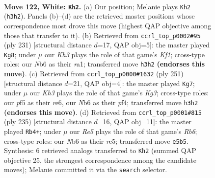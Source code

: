 \documentclass[11pt]{article}
\begin{document}
\clearpage

\begin{figure}[p]\centering
\begin{subfigure}{0.46\textwidth}\centering
\resizebox{\linewidth}{!}{%
\newchessgame
\chessboard[
  setfen={8/r5p1/1N4k1/4Rp1p/7P/6PK/8/8 w - - 2 122},
  showmover=false,
  pgfstyle=straightmove, color=movearrow, markmove={h3-h2}
]}
\caption{}
\end{subfigure}\hfill
\begin{subfigure}{0.46\textwidth}\centering
\resizebox{\linewidth}{!}{%
\newchessgame
\chessboard[
  setfen={5k2/5p2/4pP2/4P3/4PK2/2r5/8/R7 b - - 48 116},
  showmover=false,
  pgfstyle=straightmove, color=movearrow, markmove={f8-g8}
]}
\caption{}
\end{subfigure}
\\[4pt]
\begin{subfigure}{0.46\textwidth}\centering
\resizebox{\linewidth}{!}{%
\newchessgame
\chessboard[
  setfen={8/8/4R1k1/5p1p/5P1P/6PK/1r6/8 b - - 98 126},
  showmover=false,
  pgfstyle=straightmove, color=movearrow, markmove={g6-g7}
]}
\caption{}
\end{subfigure}\hfill
\begin{subfigure}{0.46\textwidth}\centering
\resizebox{\linewidth}{!}{%
\newchessgame
\chessboard[
  setfen={8/5pk1/5p2/2R4P/5KP1/1r3P2/8/8 b - - 70 118},
  showmover=false,
  pgfstyle=straightmove, color=movearrow, markmove={b3-b4}
]}
\caption{}
\end{subfigure}
\caption{\textbf{Move 122, White: \texttt{Kh2}.} (a) Our position; Melanie plays \texttt{Kh2} (\texttt{h3h2}). Panels (b)--(d) are the retrieved master positions whose correspondence most drove this move (highest QAP objective among those that transfer to it). (b) Retrieved from \texttt{ccrl\_top\_p0002\#95} (ply 231) [structural distance $d$=17, QAP obj=5]: the master played \texttt{Kg8}; under $\mu$ our \emph{Kh3} plays the role of that game's \emph{Kf1}; cross-type roles: our \emph{N}b6 as their \emph{r}a1; transferred move \texttt{h3h2} \textbf{(endorses this move)}. (c) Retrieved from \texttt{ccrl\_top\_p0000\#1632} (ply 251) [structural distance $d$=21, QAP obj=4]: the master played \texttt{Kg7}; under $\mu$ our \emph{Kh3} plays the role of that game's \emph{Kg3}; cross-type roles: our \emph{p}f5 as their \emph{r}e6, our \emph{N}b6 as their \emph{p}f4; transferred move \texttt{h3h2} \textbf{(endorses this move)}. (d) Retrieved from \texttt{ccrl\_top\_p0001\#815} (ply 235) [structural distance $d$=16, QAP obj=11]: the master played \texttt{Rb4+}; under $\mu$ our \emph{Re5} plays the role of that game's \emph{Rb6}; cross-type roles: our \emph{N}b6 as their \emph{r}c5; transferred move \texttt{e5b5}. Synthesis: 6 retrieved analogs transferred to \texttt{Kh2} (summed QAP objective 25, the strongest correspondence among the candidate moves); Melanie committed it via the \texttt{search} selector.}
\label{fig:thought-m242}
\end{figure}
\end{document}
